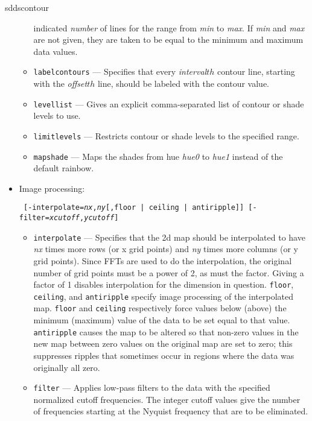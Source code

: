 \begin{sddsprog}{sddscontour}
\begin{itemize}
\begin{itemize}
        indicated {\em number} of lines for  the range from {\em min} to {\em max}.  If {\em min}
        and {\em max} are not given, they are taken to be equal to the minimum and maximum data values.
        \item \verb|labelcontours| --- Specifies that every {\em interval}$ {th}$ contour line, starting with
        the {\em offset}$ {th}$ line, should be labeled with the contour value.
        \item \verb|levellist| --- Gives an explicit comma-separated list of contour or shade levels to use.
        \item \verb|limitlevels| --- Restricts contour or shade levels to the specified range.
        \item \verb|mapshade| --- Maps the shades from hue {\em hue0} to {\em hue1} instead of the default rainbow.
        \end{itemize}
    \item Image processing:
\begin{flushleft}{\tt
[-interpolate={\em nx},{\em ny}[,{floor | ceiling | antiripple}]] [-filter={\em xcutoff},{\em ycutoff}]
}\end{flushleft}
        \begin{itemize}
        \item \verb|interpolate| --- Specifies that the 2d map should be interpolated to have {\em nx} times
        more rows (or x grid points) and {\em ny} times more columns (or y grid points).  Since FFTs are used to
        do the interpolation, the original number of grid points must be a power of 2, as must the factor.  Giving
        a factor of 1 disables interpolation for the dimension in question.  \verb|floor|, \verb|ceiling|,
        and \verb|antiripple| specify image processing of the interpolated map.  \verb|floor| and \verb|ceiling|
        respectively force values below (above) the minimum (maximum) value of the data to be set equal to that
        value.  \verb|antiripple| causes the map to be altered so that non-zero values in the new map between
        zero values on the original map are set to zero; this suppresses ripples that sometimes occur in regions
        where the data was originally all zero.
        \item \verb|filter| --- Applies low-pass filters to the data with the specified normalized cutoff
        frequencies.  The integer cutoff values give the number of frequencies starting at the Nyquist frequency
        that are to be eliminated.
        \end{itemize}

\end{itemize}
\end{sddsprog}
